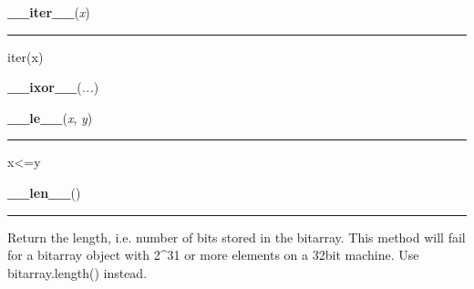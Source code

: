     \label{bitarray:_bitarray:__iter__}

    \vspace{0.5ex}

    \begin{boxedminipage}{\textwidth}

    \raggedright \textbf{\_\_iter\_\_}(\textit{x})

    \vspace{-1.5ex}

    \rule{\textwidth}{0.5\fboxrule}

iter(x)
    \vspace{1ex}

    \end{boxedminipage}

    \label{bitarray:_bitarray:__ixor__}

    \vspace{0.5ex}

    \begin{boxedminipage}{\textwidth}

    \raggedright \textbf{\_\_ixor\_\_}(\textit{...})

    \end{boxedminipage}

    \label{bitarray:_bitarray:__le__}

    \vspace{0.5ex}

    \begin{boxedminipage}{\textwidth}

    \raggedright \textbf{\_\_le\_\_}(\textit{x}, \textit{y})

    \vspace{-1.5ex}

    \rule{\textwidth}{0.5\fboxrule}

x{\textless}=y
    \vspace{1ex}

    \end{boxedminipage}

    \label{bitarray:_bitarray:__len__}

    \vspace{0.5ex}

    \begin{boxedminipage}{\textwidth}

    \raggedright \textbf{\_\_len\_\_}()

    \vspace{-1.5ex}

    \rule{\textwidth}{0.5\fboxrule}

Return the length, i.e. number of bits stored in the bitarray.
This method will fail for a bitarray object with 2{\textasciicircum}31 or more elements
on a 32bit machine.  Use bitarray.length() instead.
    \vspace{1ex}

    \end{boxedminipage}

